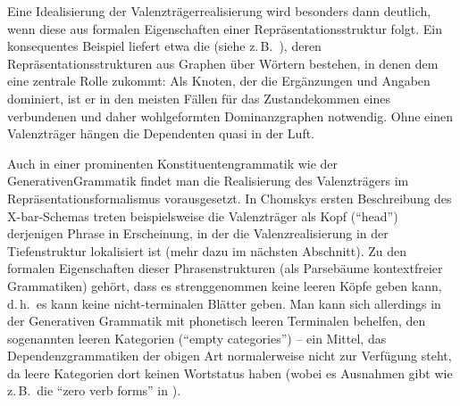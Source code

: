 Eine Idealisierung der Valenzträgerrealisierung wird besonders dann deutlich, wenn diese aus formalen Eigenschaften einer Repräsentationsstruktur folgt. Ein konsequentes Beispiel liefert etwa die  (siehe z.\,B.\ \citealt{Engel:88,Heringer:93,Eroms:00}), deren Repräsentationsstrukturen aus Graphen über Wörtern bestehen, in denen dem  eine zentrale Rolle zukommt: Als Knoten, der die Ergänzungen und Angaben dominiert, ist er in den meisten Fällen für das Zustandekommen eines verbundenen und daher wohlgeformten Dominanzgraphen notwendig. Ohne einen Valenzträger hängen die Dependenten quasi in der Luft. 

Auch in einer prominenten Konstituentengrammatik wie der Generativen\linebreak Grammatik findet man die Realisierung des Valenzträgers im Repräsentationsformalismus vorausgesetzt. In Chomskys ersten Beschreibung des X-bar-Schemas \citep[210]{Chomsky:70} treten beispielsweise die Valenzträger als Kopf ("`head"') derjenigen Phrase in Erscheinung, in der die Valenzrealisierung in der Tiefenstruktur lokalisiert ist (mehr dazu im nächsten Abschnitt). Zu den formalen Eigenschaften dieser Phrasenstrukturen (als Parsebäume kontextfreier Grammatiken) gehört, dass es strenggenommen keine leeren Köpfe geben kann, d.\,h.\ es kann keine nicht-terminalen Blätter geben. Man kann sich allerdings in der Generativen Grammatik mit phonetisch leeren Terminalen behelfen, den sogenannten leeren Kategorien ("`empty categories"') -- ein Mittel, das Dependenzgrammatiken der obigen Art normalerweise nicht zur Verfügung steht, da leere Kategorien dort keinen Wortstatus haben (wobei es Ausnahmen gibt wie z.\,B.\ die "`zero verb forms"' in \citealt{Melcuk:09}).  %

